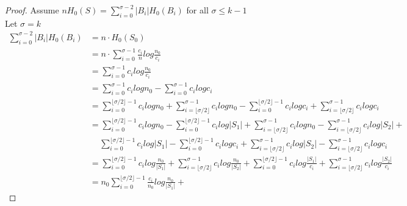 \documentclass[11pt]{article}
\begin{document}
\begin{proof}
Assume $nH_0(S) = \sum_{i=0}^{\sigma-2}|B_i|H_0(B_i)$ for all $\sigma \leq k-1$\\
Let $\sigma = k$
\allowdisplaybreaks
\begin{align*}
\sum_{i=0}^{\sigma-2} |B_i|H_0(B_i) &= n \cdot H_0(S_0) \\
                                    &= n \cdot \sum_{i=0}^{\sigma-1} \frac{c_i}{n} log \frac{n_0}{c_i}  \\
                                    &= \sum_{i=0}^{\sigma-1} c_i log \frac{n_0}{c_i} \\
                                    &= \sum_{i=0}^{\sigma-1} c_i log n_0 - \sum_{i=0}^{\sigma-1} c_i log c_i \\
                                    &= \sum_{i=0}^{\lfloor \sigma/2 \rfloor - 1} c_i log n_0 +
                                       \sum_{i=\lfloor \sigma/2 \rfloor}^{\sigma - 1} c_i log n_0 -
                                       \sum_{i=0}^{\lfloor \sigma/2 \rfloor - 1} c_i log c_i +
                                       \sum_{i=\lfloor \sigma/2 \rfloor}^{\sigma - 1} c_i log c_i \\
                                    &= \sum_{i=0}^{\lfloor \sigma/2 \rfloor - 1} c_i log n_0 -
                                       \sum_{i=0}^{\lfloor \sigma/2 \rfloor - 1} c_i log |S_1| +
                                       \sum_{i=\lfloor \sigma/2 \rfloor}^{\sigma - 1} c_i log n_0 -
                                       \sum_{i=\lfloor \sigma/2 \rfloor}^{\sigma-1} c_i log |S_2| + \\
                                    &\,\quad\sum_{i=0}^{\lfloor \sigma/2 \rfloor - 1} c_i log |S_1| -
                                       \sum_{i=0}^{\lfloor \sigma/2 \rfloor - 1} c_i log c_i +
                                       \sum_{i=\lfloor \sigma/2 \rfloor}^{\sigma-1} c_i log |S_2| -
                                       \sum_{i=\lfloor \sigma/2 \rfloor}^{\sigma - 1} c_i log c_i \\
                                    &= \sum_{i=0}^{\lfloor \sigma/2 \rfloor - 1} c_i log \frac{n_0}{|S_1|} +
                                       \sum_{i=\lfloor \sigma/2 \rfloor}^{\sigma - 1} c_i log \frac{n_0}{|S_2|} +
                                       \sum_{i=0}^{\lfloor \sigma/2 \rfloor - 1} c_i log \frac{|S_1|}{c_i} +
                                       \sum_{i=\lfloor \sigma/2 \rfloor}^{\sigma - 1} c_i log \frac{|S_2|}{c_i} \\
                                    &= n_0 \sum_{i=0}^{\lfloor \sigma/2 \rfloor - 1} \frac{c_i}{n_0} log \frac{n_0}{|S_1|} +

\end{align*}
\end{proof}
\end{document}

